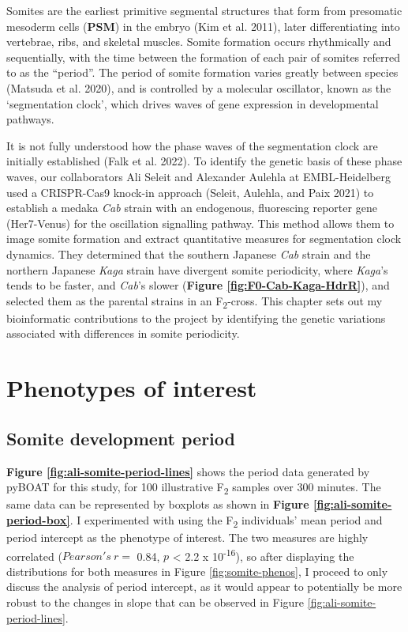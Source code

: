 \documentclass[
]{book}
\begin{document}

Somites are the earliest primitive segmental structures that form from presomatic mesoderm cells (\textbf{PSM}) in the embryo (Kim et al. 2011), later differentiating into vertebrae, ribs, and skeletal muscles. Somite formation occurs rhythmically and sequentially, with the time between the formation of each pair of somites referred to as the ``period''. The period of somite formation varies greatly between species (Matsuda et al. 2020), and is controlled by a molecular oscillator, known as the `segmentation clock', which drives waves of gene expression in developmental pathways.

It is not fully understood how the phase waves of the segmentation clock are initially established (Falk et al. 2022). To identify the genetic basis of these phase waves, our collaborators Ali Seleit and Alexander Aulehla at EMBL-Heidelberg used a CRISPR-Cas9 knock-in approach (Seleit, Aulehla, and Paix 2021) to establish a medaka \emph{Cab} strain with an endogenous, fluorescing reporter gene (Her7-Venus) for the oscillation signalling pathway. This method allows them to image somite formation and extract quantitative measures for segmentation clock dynamics. They determined that the southern Japanese \emph{Cab} strain and the northern Japanese \emph{Kaga} strain have divergent somite periodicity, where \emph{Kaga}'s tends to be faster, and \emph{Cab}'s slower (\textbf{Figure \ref{fig:F0-Cab-Kaga-HdrR}}), and selected them as the parental strains in an F\textsubscript{2}-cross. This chapter sets out my bioinformatic contributions to the project by identifying the genetic variations associated with differences in somite periodicity.

\hypertarget{somite-phenotype}{%
\section{Phenotypes of interest}\label{somite-phenotype}}

\hypertarget{somite-development-period}{%
\subsection{Somite development period}\label{somite-development-period}}

\textbf{Figure \ref{fig:ali-somite-period-lines}} shows the period data generated by pyBOAT for this study, for 100 illustrative F\textsubscript{2} samples over 300 minutes. The same data can be represented by boxplots as shown in \textbf{Figure \ref{fig:ali-somite-period-box}}. I experimented with using the F\textsubscript{2} individuals' mean period and period intercept as the phenotype of interest. The two measures are highly correlated (\(Pearson's~r =\) 0.84, \(p\) \textless{} 2.2 x 10\textsuperscript{-16}), so after displaying the distributions for both measures in Figure \ref{fig:somite-phenos}, I proceed to only discuss the analysis of period intercept, as it would appear to potentially be more robust to the changes in slope that can be observed in Figure \ref{fig:ali-somite-period-lines}.
\end{document}
